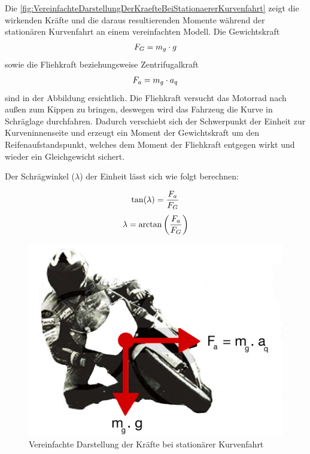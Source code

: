 Die \autoref{fig:VereinfachteDarstellungDerKraefteBeiStationaererKurvenfahrt} zeigt die wirkenden Kräfte und die daraus resultierenden Momente während der stationären Kurvenfahrt an einem vereinfachten Modell. Die Gewichtskraft 
\begin{align*}
	\centering
	F_G = m_g \cdot g
\end{align*}
sowie die Fliehkraft beziehungsweise Zentrifugalkraft 
\begin{align*}
	\centering
	F_a = m_g \cdot a_q
\end{align*}
sind in der Abbildung ersichtlich. Die Fliehkraft versucht das Motorrad nach außen zum Kippen zu bringen, deswegen wird das Fahrzeug die Kurve in Schräglage durchfahren. Dadurch verschiebt sich der Schwerpunkt der Einheit zur Kurveninnenseite und erzeugt ein Moment der Gewichtskraft um den Reifenaufstandspunkt, welches dem Moment der Fliehkraft entgegen wirkt und wieder ein Gleichgewicht sichert.

Der Schrägwinkel ($\lambda$) der Einheit lässt sich wie folgt berechnen:


\begin{align*}
	\centering
	\tan(\lambda)  =  \frac{F_a}{F_G}
\end{align*}
\begin{align}
	\centering
	\lambda  =  \arctan \left(\frac{F_a}{F_G}\right)
	\label{gl:Schraegwinkel}
\end{align}


\begin{figure}
	\centering
	\includegraphics[width=0.6\linewidth]{Bilder/VereinfachteDarstellungDerKraefteBeiStationaererKurvenfahrt2_pdf.pdf}
	\caption{Vereinfachte Darstellung der Kräfte bei stationärer Kurvenfahrt \citep{Haedrich2012}}
	\label{fig:VereinfachteDarstellungDerKraefteBeiStationaererKurvenfahrt}
\end{figure}


